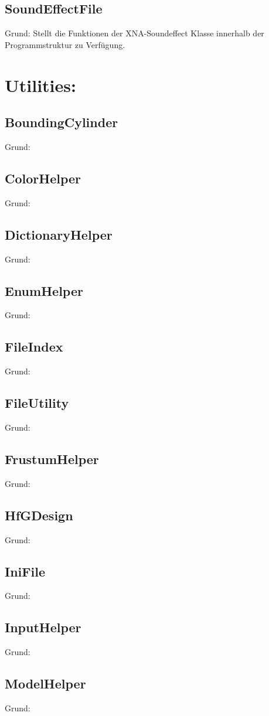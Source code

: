 \subsection{SoundEffectFile}
Grund: Stellt die Funktionen der XNA-Soundeffect Klasse innerhalb der Programmstruktur zu Verfügung.

\section{Utilities:}
\subsection{BoundingCylinder}
Grund:
\subsection{ColorHelper}
Grund:
\subsection{DictionaryHelper}
Grund:
\subsection{EnumHelper}
Grund:
\subsection{FileIndex}
Grund:
\subsection{FileUtility}
Grund:
\subsection{FrustumHelper}
Grund:
\subsection{HfGDesign}
Grund:
\subsection{IniFile}
Grund:
\subsection{InputHelper}
Grund:
\subsection{ModelHelper}
Grund:
